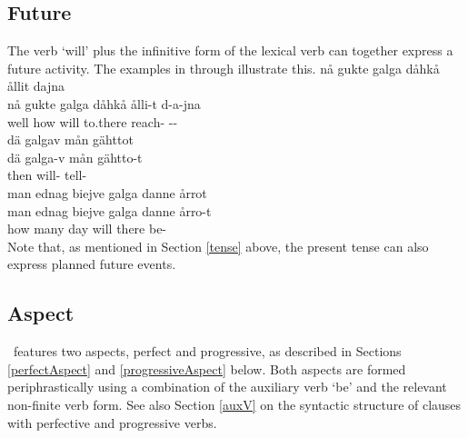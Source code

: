 \subsection{Future}\label{futureTense}
The verb  ‘will’ plus the infinitive form of the lexical verb can together express a future activity. The examples in  through  illustrate this.
\ea\label{futureTenseEx1}%
\glll	nå gukte galga dåhkå ållit dajna\\
	nå gukte galga dåhkå ålli-t d-a-jna\\
	well how will\BS{} to.there reach- --\\\nopagebreak
{}	
\z
\ea\label{futureTenseEx2}%
\glll	dä galgav mån gähttot\\
	dä galga-v mån gähtto-t\\
	then will-  tell-\\\nopagebreak
{}	
\z
\ea\label{futureTenseEx3}%
\glll	man ednag biejve galga danne årrot\\
	man ednag biejve galga danne årro-t\\
	how many day\BS{} will\BS{} there be-\\\nopagebreak
{}	
\z
Note that, as mentioned in Section \ref{tense} above, the present tense can also express planned future events. 

\subsection{Aspect}\label{aspect}
\PS\ features two aspects, perfect and progressive, as described in Sections \ref{perfectAspect} and \ref{progressiveAspect} below. Both aspects are formed periphrastically using a combination of the auxiliary verb  ‘be’ and the relevant non-finite verb form. 
See also Section \ref{auxV} on the syntactic structure of clauses with perfective and progressive verbs. 

